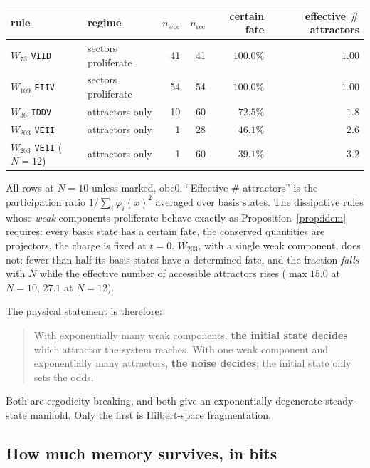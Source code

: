 \documentclass[11pt]{article}
\newcommand{\rt}[1]{\texttt{#1}}
\theoremstyle{plain}
\theoremstyle{definition}
\theoremstyle{remark}
\begin{document}
\begin{center}
\small
\begin{tabular}{@{}llrrrr@{}}
\toprule
rule & regime & $n_{\mathrm{wcc}}$ & $n_{\mathrm{rec}}$
  & certain fate & effective \# attractors \\
\midrule
$W_{73}$  \rt{VIID}  & sectors proliferate & 41 & 41 & $100.0\%$ & $1.00$ \\
$W_{109}$ \rt{EIIV}  & sectors proliferate & 54 & 54 & $100.0\%$ & $1.00$ \\
$W_{36}$  \rt{IDDV}  & attractors only     & 10 & 60 & $72.5\%$  & $1.8$ \\
$W_{203}$ \rt{VEII}  & attractors only     & 1  & 28 & $46.1\%$  & $2.6$ \\
$W_{203}$ \rt{VEII} ($N=12$) & attractors only & 1 & 60 & $39.1\%$ & $3.2$ \\
\bottomrule
\end{tabular}
\end{center}

\noindent All rows at $N=10$ unless marked, obc0. ``Effective \# attractors''
is the participation ratio $1/\sum_i \varphi_i(x)^2$ averaged over basis
states. The dissipative rules whose \emph{weak} components proliferate behave
exactly as Proposition~\ref{prop:idem} requires: every basis state has a
certain fate, the conserved quantities are projectors, the charge is fixed at
$t=0$. $W_{203}$, with a single weak component, does not: fewer than half its
basis states have a determined fate, and the fraction \emph{falls} with $N$
while the effective number of accessible attractors rises ($\max 15.0$ at
$N=10$, $27.1$ at $N=12$).

The physical statement is therefore:

\begin{quote}
With exponentially many weak components, \textbf{the initial state decides}
which attractor the system reaches. With one weak component and exponentially
many attractors, \textbf{the noise decides}; the initial state only sets the
odds.
\end{quote}

Both are ergodicity breaking, and both give an exponentially degenerate
steady-state manifold. Only the first is Hilbert-space fragmentation.

\subsection{How much memory survives, in bits}
\label{sec:bits}
\end{document}
